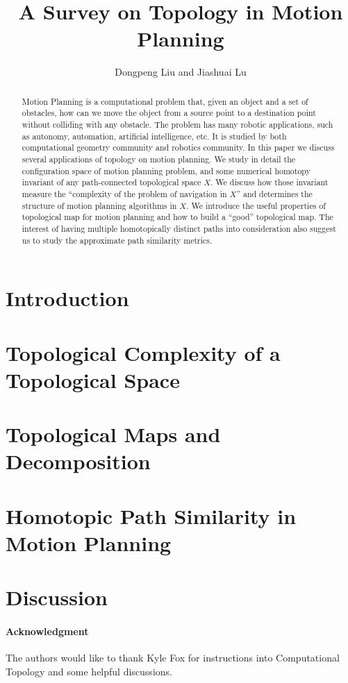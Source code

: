 \documentclass[12pt,twoside]{article}
\begin{document}
\title{A Survey on Topology in Motion Planning}

\author{
Dongpeng Liu %
and Jiashuai Lu%
}


\maketitle

%
\begin{abstract}
  Motion Planning is a computational problem that, given an object and a set of obstacles, how can we move the object from a source point to a destination point without colliding with any obstacle.
  The problem has many robotic applications, such as autonomy, automation, artificial intelligence, etc. It is studied by both computational geometry community and robotics community.
  In this paper we discuss several applications of topology on motion planning.
  We study in detail the configuration space of motion planning problem, and some numerical homotopy invariant of any path-connected topological space \(X\). We discuss how those invariant measure the ``complexity of the problem of navigation in \(X\)'' and determines the structure of motion planning algorithms in \(X\).
  We introduce the useful properties of topological map for motion planning and how to build a ``good'' topological map. The interest of having multiple homotopically distinct paths into consideration also suggest us to study the approximate path similarity metrics.
\end{abstract}

\setcounter{page}{0}

\section{Introduction}\label{sec:intro}


\section{Topological Complexity of a Topological Space}\label{sec:complexity}

\section{Topological Maps and Decomposition}\label{sec:decomposition}

\section{Homotopic Path Similarity in Motion Planning}\label{sec:sim}

\section{Discussion}\label{sec:dis}

\paragraph*{Acknowledgment} The authors would like to thank Kyle Fox for instructions into Computational Topology and some helpful discussions.



\end{document}
